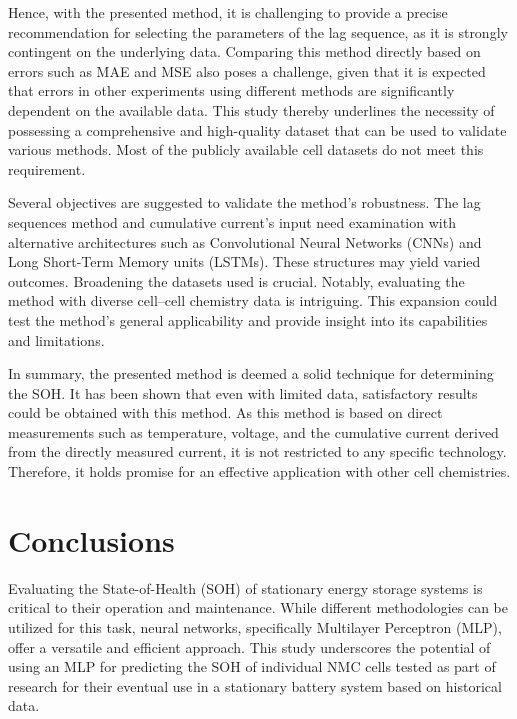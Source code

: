 \documentclass[energies,article,accept,pdftex,moreauthors]{Definitions/mdpi}
\begin{document}

Hence, with the presented method, it is challenging to provide a precise recommendation for selecting the parameters of the lag sequence, as it is strongly contingent on the underlying data. Comparing this method directly based on errors such as MAE and MSE also poses a challenge, given that it is expected that errors in other experiments using different methods are significantly dependent on the available data. This study thereby underlines the necessity of possessing a comprehensive and high-quality dataset that can be used to validate various methods. Most of the publicly available cell datasets do not meet this requirement.

Several objectives are suggested to validate the method's robustness. The lag sequences method and cumulative current's input need examination with alternative architectures such as Convolutional Neural Networks (CNNs) and Long Short-Term Memory units (LSTMs). These structures may yield varied outcomes. Broadening the datasets used is crucial. Notably, evaluating the method with diverse cell--cell %
 chemistry data is intriguing. This expansion could test the method's general applicability and provide insight into its capabilities and limitations.

In summary, the presented method is deemed a solid technique for determining the SOH. It has been shown that even with limited data, satisfactory results could be obtained with this method. As this method is based on direct measurements such as temperature, voltage, and the cumulative current derived from the directly measured current, it is not restricted to any specific technology. Therefore, it holds promise for an effective application with other cell chemistries.

\section{Conclusions}

Evaluating the State-of-Health (SOH) of stationary energy storage systems is critical to their operation and maintenance. While different methodologies can be utilized for this task, neural networks, specifically Multilayer Perceptron (MLP), offer a versatile and efficient approach. This study underscores the potential of using an MLP for predicting the SOH of individual NMC cells tested as part of research for their eventual use in a stationary battery system based on historical data.
\end{document}
